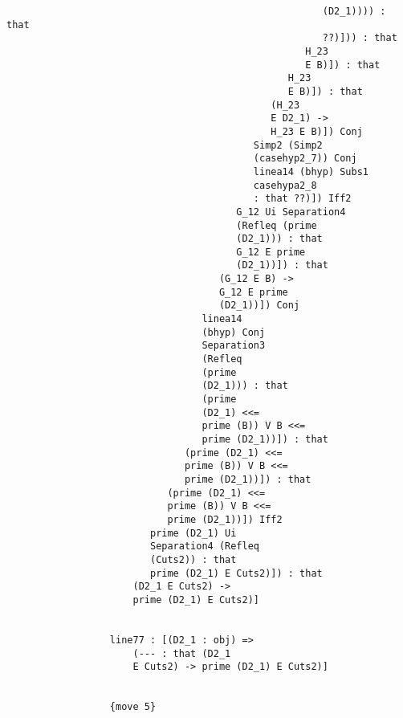 \documentclass[12pt]{article}
\begin{document}
\begin{verbatim}
                                                       (D2_1)))) : that 
                                                       ??)])) : that 
                                                    H_23 
                                                    E B)]) : that 
                                                 H_23 
                                                 E B)]) : that 
                                              (H_23 
                                              E D2_1) -> 
                                              H_23 E B)]) Conj 
                                           Simp2 (Simp2 
                                           (casehyp2_7)) Conj 
                                           linea14 (bhyp) Subs1 
                                           casehypa2_8 
                                           : that ??)]) Iff2 
                                        G_12 Ui Separation4 
                                        (Refleq (prime 
                                        (D2_1))) : that 
                                        G_12 E prime 
                                        (D2_1))]) : that 
                                     (G_12 E B) -> 
                                     G_12 E prime 
                                     (D2_1))]) Conj 
                                  linea14 
                                  (bhyp) Conj 
                                  Separation3 
                                  (Refleq 
                                  (prime 
                                  (D2_1))) : that 
                                  (prime 
                                  (D2_1) <<= 
                                  prime (B)) V B <<= 
                                  prime (D2_1))]) : that 
                               (prime (D2_1) <<= 
                               prime (B)) V B <<= 
                               prime (D2_1))]) : that 
                            (prime (D2_1) <<= 
                            prime (B)) V B <<= 
                            prime (D2_1))]) Iff2 
                         prime (D2_1) Ui 
                         Separation4 (Refleq 
                         (Cuts2)) : that 
                         prime (D2_1) E Cuts2)]) : that 
                      (D2_1 E Cuts2) -> 
                      prime (D2_1) E Cuts2)]


                  line77 : [(D2_1 : obj) => 
                      (--- : that (D2_1 
                      E Cuts2) -> prime (D2_1) E Cuts2)]


                  {move 5}


\end{verbatim}
\end{document}
